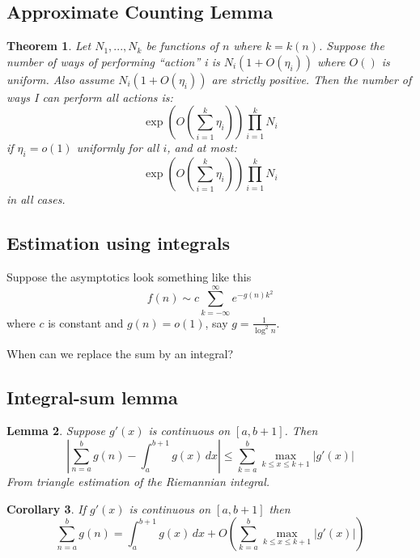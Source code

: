 \documentclass[]{article}
\newtheorem{theorem}{Theorem}
\newtheorem{corollary}[theorem]{Corollary}
\newtheorem{lemma}[theorem]{Lemma}
\theoremstyle{definition}
\numberwithin{theorem}{section}
\numberwithin{equation}{section}
\begin{document}
\subsection{Approximate Counting Lemma}
\begin{theorem}
	Let $N_1, ..., N_k$ be functions of $n$ where $k = k(n)$. Suppose the number of ways of performing ``action'' i is $N_i( 1 + O(\eta_i))$ where $O()$ is uniform. Also assume $N_i(1 + O(\eta_i))$ are strictly positive. Then the number of ways I can perform all actions is:
	\begin{equation}
		\exp\left(O\left(\sum_{i = 1}^{k}\eta_i\right)\right) \prod_{i = 1}^k N_i
	\end{equation}
	if $\eta_i = o(1)$ uniformly for all $i$, and at most:
		\begin{equation}
		\exp\left(O\left(\sum_{i = 1}^{k}\eta_i\right)\right) \prod_{i = 1}^k N_i
	\end{equation}
	in all cases. 
\end{theorem}

\subsection{Estimation using integrals}
Suppose the asymptotics look something like this
\begin{equation}
	f(n) \sim c\sum_{k = -\infty}^{\infty} e^{-g(n) k^2}
\end{equation}
where $c$ is constant and $g(n) = o(1)$, say $g = \frac{1}{\log^2 n}$.

When can we replace the sum by an integral?

\subsection{Integral-sum lemma}
\begin{lemma}
		Suppose $g'(x)$ is continuous on $[a, b + 1]$. Then
	\begin{equation}
		\left| \sum_{n = a}^{b} g(n) - \int_{a}^{b + 1}g(x)\, dx\right| \leq \sum_{k = a}^{b} \max_{k \leq x \leq k + 1} |g'(x)|
	\end{equation}
	From triangle estimation of the Riemannian integral. 
\end{lemma}

\begin{corollary}
	If $g'(x)$ is continuous on $[a, b + 1]$ then
	\begin{equation}
		\sum_{n = a}^{b} g(n)  = \int_{a}^{b + 1}g(x) \, dx+ O\left( \sum_{k = a}^{b} \max_{k \leq x \leq k + 1} |g'(x)| \right)
	\end{equation}
\end{corollary}
\end{document}
